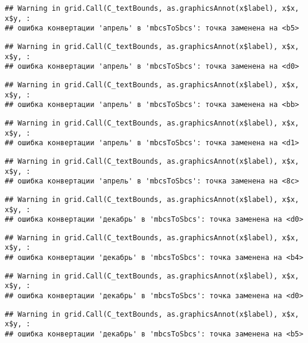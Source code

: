 \documentclass[
]{article}
\begin{document}
\begin{verbatim}
## Warning in grid.Call(C_textBounds, as.graphicsAnnot(x$label), x$x, x$y, :
## ошибка конвертации 'апрель' в 'mbcsToSbcs': точка заменена на <b5>
\end{verbatim}

\begin{verbatim}
## Warning in grid.Call(C_textBounds, as.graphicsAnnot(x$label), x$x, x$y, :
## ошибка конвертации 'апрель' в 'mbcsToSbcs': точка заменена на <d0>
\end{verbatim}

\begin{verbatim}
## Warning in grid.Call(C_textBounds, as.graphicsAnnot(x$label), x$x, x$y, :
## ошибка конвертации 'апрель' в 'mbcsToSbcs': точка заменена на <bb>
\end{verbatim}

\begin{verbatim}
## Warning in grid.Call(C_textBounds, as.graphicsAnnot(x$label), x$x, x$y, :
## ошибка конвертации 'апрель' в 'mbcsToSbcs': точка заменена на <d1>
\end{verbatim}

\begin{verbatim}
## Warning in grid.Call(C_textBounds, as.graphicsAnnot(x$label), x$x, x$y, :
## ошибка конвертации 'апрель' в 'mbcsToSbcs': точка заменена на <8c>
\end{verbatim}

\begin{verbatim}
## Warning in grid.Call(C_textBounds, as.graphicsAnnot(x$label), x$x, x$y, :
## ошибка конвертации 'декабрь' в 'mbcsToSbcs': точка заменена на <d0>
\end{verbatim}

\begin{verbatim}
## Warning in grid.Call(C_textBounds, as.graphicsAnnot(x$label), x$x, x$y, :
## ошибка конвертации 'декабрь' в 'mbcsToSbcs': точка заменена на <b4>
\end{verbatim}

\begin{verbatim}
## Warning in grid.Call(C_textBounds, as.graphicsAnnot(x$label), x$x, x$y, :
## ошибка конвертации 'декабрь' в 'mbcsToSbcs': точка заменена на <d0>
\end{verbatim}

\begin{verbatim}
## Warning in grid.Call(C_textBounds, as.graphicsAnnot(x$label), x$x, x$y, :
## ошибка конвертации 'декабрь' в 'mbcsToSbcs': точка заменена на <b5>
\end{verbatim}
\end{document}
